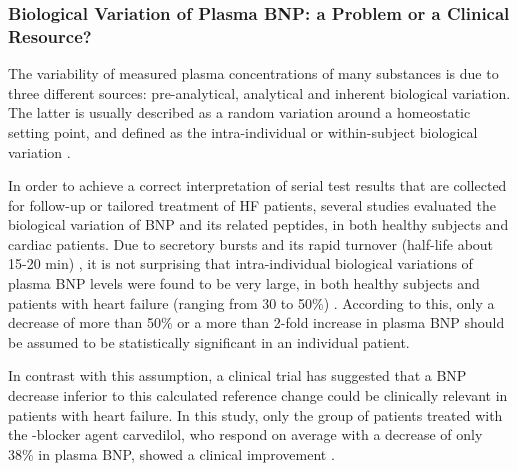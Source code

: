 \documentclass[14pt,a4paper,onecolumn]{extarticle}
\begin{document}
\subsubsection{ Biological Variation of Plasma BNP: a Problem or a Clinical Resource?}

The variability of measured plasma concentrations of many substances is due to three different sources: pre-analytical, analytical and inherent biological variation. The latter is usually described as a random variation around a homeostatic setting point, and defined as the intra-individual or within-subject biological variation \citep{bib395}.


In order to achieve a correct interpretation of serial test results that are collected for follow-up or tailored treatment of HF patients, several studies \citep{bib397} \citep{bib398} \citep{bib399} \citep{bib3100} \citep{bib3101} evaluated the biological variation of BNP and its related peptides, in both healthy subjects and cardiac patients. Due to secretory bursts and its rapid turnover (half-life about 15-20 min) \citep{bib31} \citep{bib3102} , it is not surprising that intra-individual biological variations of plasma BNP levels were found to be very large, in both healthy subjects and patients with heart failure (ranging from 30 to 50\%) \citep{bib397} \citep{bib399} \citep{bib3100} \citep{bib3101}.  %
According to this, only a decrease of more than 50\% or a more than 2-fold increase in plasma BNP should be assumed to be statistically significant in an individual patient.

In contrast with this assumption, a clinical trial \citep{bib390} has suggested that a BNP decrease inferior to this calculated reference change could be clinically relevant in patients with heart failure. In this study, only the group of patients treated with the \beta-blocker agent carvedilol, who respond on average with a decrease of only 38\% in plasma BNP, showed a clinical improvement \citep{bib390}.
\end{document}
